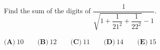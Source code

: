 Find the sum of the digits of $\dfrac{1}{\sqrt{1+\dfrac1{21^2}+\dfrac1{22^2}}-1}$.

$\textbf{(A)}\ 10\qquad\textbf{(B)}\ 12\qquad\textbf{(C)}\ 11\qquad\textbf{(D)}\ 14\qquad\textbf{(E)}\ 15$
